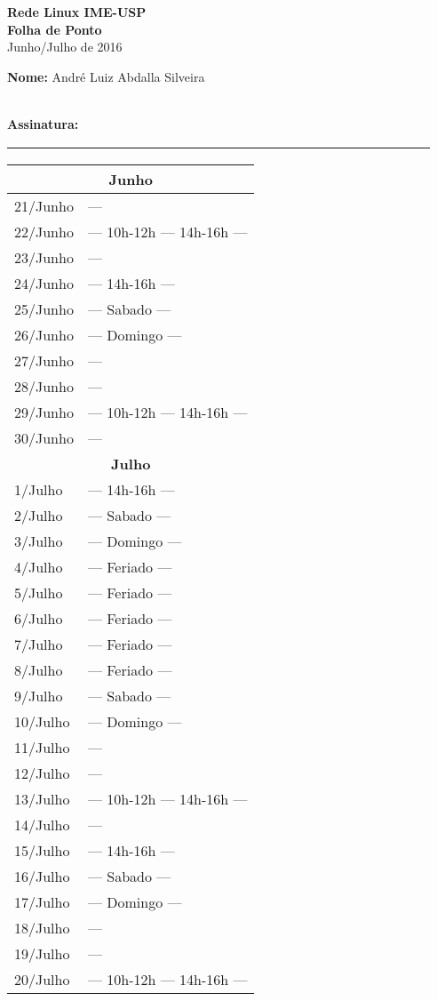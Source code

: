 \documentclass[12pt,a4paper]{article}
\begin{document}
\newcommand{\sab}{--- Sabado ---}
\newcommand{\dom}{--- Domingo ---}
\newcommand{\fer}{--- Feriado ---}
\newcommand{\seg}{--- }
\newcommand{\ter}{--- }
\newcommand{\qua}{--- 10h-12h --- 14h-16h --- }
\newcommand{\qui}{--- }
\newcommand{\sex}{--- 14h-16h --- }

\thispagestyle{empty}
\begin{center}
\Huge
\textbf{Rede Linux IME-USP\\Folha de Ponto}
\\
\large
Junho/Julho de 2016
\end{center}

\large
\noindent \textbf{Nome:} André Luiz Abdalla Silveira

\\
\textbf{Assinatura:}
\underline{~~~~~~~~~~~~~~~~~~~~~~~~~~~~~~~~~~~~~~~~~~~~~~~~~~~~~~~~~~~~~~~~~~~~}
\\
\normalsize
\begin{center}
\begin{tabular}{|p{3.5cm}|p{9cm}|}
\hline
\multicolumn{2}{|c|}{\textbf{Junho}} \\ \hline
21/Junho & \ter \\ \hline
22/Junho & \qua \\ \hline
23/Junho & \qui \\ \hline
24/Junho & \sex \\ \hline
25/Junho & \sab \\ \hline
26/Junho & \dom \\ \hline
27/Junho & \seg \\ \hline
28/Junho & \ter \\ \hline
29/Junho & \qua \\ \hline
30/Junho & \qui \\ \hline
\multicolumn{2}{|c|}{\textbf{Julho}} \\ \hline
1/Julho & \sex \\ \hline
2/Julho & \sab \\ \hline
3/Julho & \dom \\ \hline
4/Julho & \fer \\ \hline
5/Julho & \fer \\ \hline
6/Julho & \fer \\ \hline
7/Julho & \fer \\ \hline
8/Julho & \fer \\ \hline
9/Julho & \sab \\ \hline
10/Julho & \dom \\ \hline
11/Julho & \seg \\ \hline
12/Julho & \ter \\ \hline
13/Julho & \qua \\ \hline
14/Julho & \qui \\ \hline
15/Julho & \sex \\ \hline
16/Julho & \sab \\ \hline
17/Julho & \dom \\ \hline
18/Julho & \seg \\ \hline
19/Julho & \ter \\ \hline
20/Julho & \qua \\ \hline
\end{tabular}
\end{center}
\end{document}

